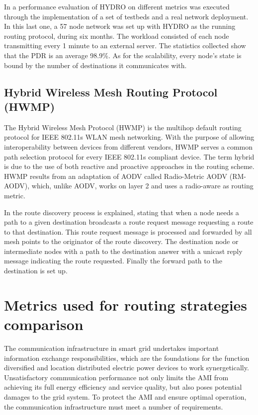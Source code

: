 \documentclass[11pt,draftclsnofoot,onecolumn]{IEEEtran}
\begin{document}
In \cite{Dawson2010} a performance evaluation of HYDRO on different metrics was executed through the implementation of a set of testbeds and a real network deployment. In this last one, a 57 node network was set up with HYDRO as the running routing protocol, during six months. The workload consisted of each node transmitting every 1 minute to an external server. The statistics collected show that the PDR is an average 98.9\%. As for the scalability, every node’s state is bound by the number of destinations it communicates with. 

\subsection{Hybrid Wireless Mesh Routing Protocol (HWMP)}\label{hwmp}

The Hybrid Wireless Mesh Protocol (HWMP) is the multihop default routing protocol for IEEE 802.11s WLAN mesh networking. With the purpose of allowing interoperability between devices from different vendors, HWMP serves a common path selection protocol for every IEEE 802.11s compliant device. The term hybrid is due to the use of both reactive and proactive approaches in the routing scheme. HWMP results from an adaptation of AODV called Radio-Metric AODV (RM-AODV), which, unlike AODV, works on layer 2 and uses a radio-aware as routing metric. 

In \cite{Bahr2006} the route discovery process is explained, stating that when a node needs a path to a given destination broadcasts a route request message requesting a route to that destination. This route request message is processed and forwarded by all mesh points to the originator of the route discovery. The destination node or intermediate nodes with a path to the destination answer with a unicast reply message indicating the route requested. Finally the forward path to the destination is set up. 


\section{Metrics used for routing strategies comparison}\label{metrics}

The communication infrastructure in smart grid undertakes important information exchange responsibilities, which are the foundations for the function diversified and location distributed electric power devices to work synergetically. Unsatisfactory communication performance not only limits the AMI from achieving its full energy efficiency and service quality, but also poses potential damages to the grid system. To protect the AMI and ensure optimal operation, the communication infrastructure must meet a number of requirements.
\end{document}
